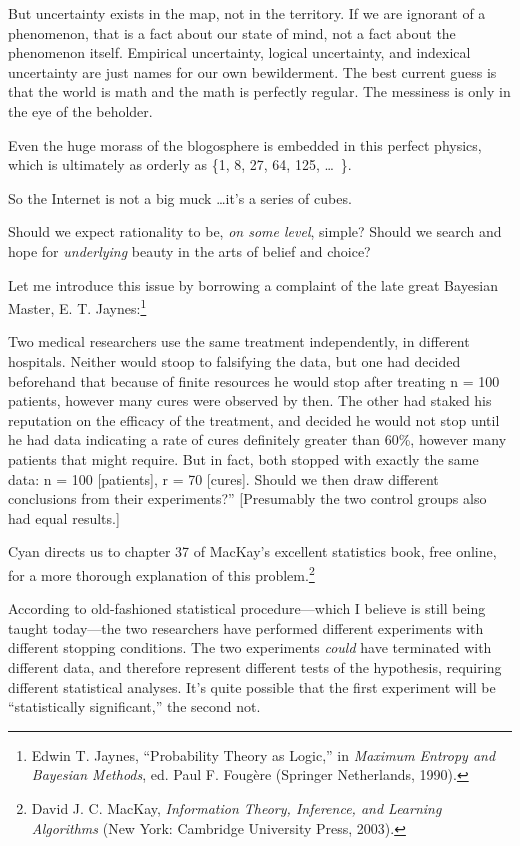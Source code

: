 {
 But uncertainty exists in the map, not in the territory. If we are
ignorant of a phenomenon, that is a fact about our state of mind, not a
fact about the phenomenon itself. Empirical uncertainty, logical
uncertainty, and indexical uncertainty are just names for our own
bewilderment. The best current guess is that the world is math and the
math is perfectly regular. The messiness is only in the eye of the
beholder.}

{
 Even the huge morass of the blogosphere is embedded in this
perfect physics, which is ultimately as orderly as
\{1, 8, 27, 64, 125,
\ldots~\}.}

{
 So the Internet is not a big muck \ldots it's a
series of cubes.}

\myendsectiontext


{
 Should we expect rationality to be, \textit{on some level},
simple? Should we search and hope for \textit{underlying} beauty in the
arts of belief and choice? }

{
 Let me introduce this issue by borrowing a complaint of the late
great Bayesian Master, E. T. Jaynes:\footnote{Edwin T. Jaynes, ``Probability Theory as
Logic,'' in \textit{Maximum Entropy and Bayesian
Methods}, ed. Paul F. Fougère (Springer Netherlands, 1990).}}

{
 Two medical researchers use the same treatment independently, in
different hospitals. Neither would stoop to falsifying the data, but
one had decided beforehand that because of finite resources he would
stop after treating n = 100 patients, however many cures were observed
by then. The other had staked his reputation on the efficacy of the
treatment, and decided he would not stop until he had data indicating a
rate of cures definitely greater than 60\%, however many patients that
might require. But in fact, both stopped with exactly the same data: n
= 100 [patients], r = 70 [cures]. Should we then draw different
conclusions from their experiments?'' [Presumably the
two control groups also had equal results.]}

{
 Cyan directs us to chapter 37 of MacKay's
excellent statistics book, free online, for a more thorough explanation
of this problem.\footnote{David J. C. MacKay, \textit{Information Theory, Inference, and
Learning Algorithms} (New York: Cambridge University Press, 2003).}}

{
 According to old-fashioned statistical procedure---which I believe
is still being taught today---the two researchers have performed
different experiments with different stopping conditions. The two
experiments \textit{could} have terminated with different data, and
therefore represent different tests of the hypothesis, requiring
different statistical analyses. It's quite possible
that the first experiment will be ``statistically
significant,'' the second not.}

